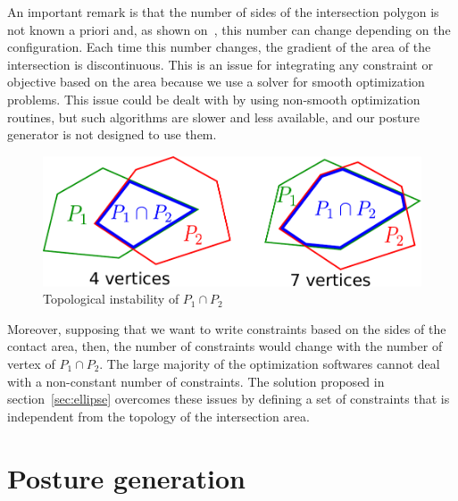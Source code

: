 An important remark is that the number of sides of the intersection polygon is not known a priori and, as shown on~, this number can change depending on the configuration. Each time this number changes, the gradient of the area of the intersection is discontinuous. This is an issue for integrating any constraint or objective based on the area because we use a solver for smooth optimization problems. This issue could be dealt with by using non-smooth optimization routines, but such algorithms are slower and less available, and our posture generator is not designed to use them.
\begin{figure}[!htb]
 \centering
 \includegraphics[width=0.8\columnwidth]{papers/IROS2014/figure/polygon-inter.pdf}
 \caption{Topological instability of $P_1 \cap P_2$}
 \label{fig:polygon-inter}
\end{figure}
Moreover, supposing that we want to write constraints based on the sides of the contact area, then, the number of constraints would change with the number of vertex of $P_1 \cap P_2$. The large majority of the optimization softwares cannot deal with a non-constant number of constraints. The solution proposed in section~\ref{sec:ellipse} overcomes these issues by defining a set of constraints that is independent from the topology of the intersection area.

\section{Posture generation}
\label{sec:pg}

